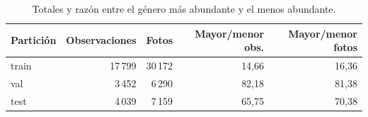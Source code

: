 \begin{table}[H]
\centering
\small
\caption{Totales y razón entre el género más abundante y el menos abundante.}
\label{tab:ratios}
\begin{tabularx}{\linewidth}{Y r r r r}
\toprule
\textbf{Partición} & \textbf{Observaciones} & \textbf{Fotos} & \textbf{Mayor/menor obs.} & \textbf{Mayor/menor fotos}\\
\midrule
train & 17\,799 & 30\,172 & 14,66 & 16,36\\
val & 3\,452 & 6\,290 & 82,18 & 81,38\\
test & 4\,039 & 7\,159 & 65,75 & 70,38\\
\bottomrule
\end{tabularx}
\end{table}
